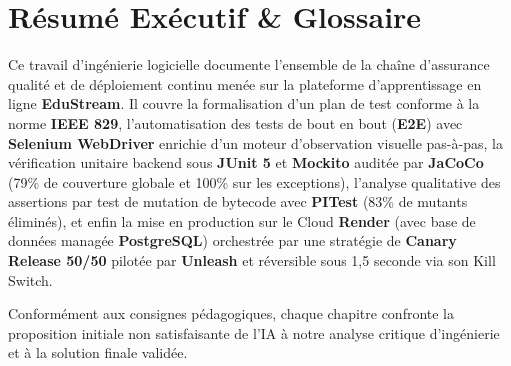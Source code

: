 \documentclass[11pt, a4paper, openany]{report}
\begin{document}
\newpage
\chapter*{Résumé Exécutif \& Glossaire}

Ce travail d'ingénierie logicielle documente l'ensemble de la chaîne d'assurance qualité et de déploiement continu menée sur la plateforme d'apprentissage en ligne \textbf{EduStream}. Il couvre la formalisation d'un plan de test conforme à la norme \textbf{IEEE 829}, l'automatisation des tests de bout en bout (\textbf{E2E}) avec \textbf{Selenium WebDriver} enrichie d'un moteur d'observation visuelle pas-à-pas, la vérification unitaire backend sous \textbf{JUnit 5} et \textbf{Mockito} auditée par \textbf{JaCoCo} (79\% de couverture globale et 100\% sur les exceptions), l'analyse qualitative des assertions par test de mutation de bytecode avec \textbf{PITest} (83\% de mutants éliminés), et enfin la mise en production sur le Cloud \textbf{Render} (avec base de données managée \textbf{PostgreSQL}) orchestrée par une stratégie de \textbf{Canary Release 50/50} pilotée par \textbf{Unleash} et réversible sous 1,5 seconde via son Kill Switch.

Conformément aux consignes pédagogiques, chaque chapitre confronte la proposition initiale non satisfaisante de l'IA à notre analyse critique d'ingénierie et à la solution finale validée.
\end{document}
